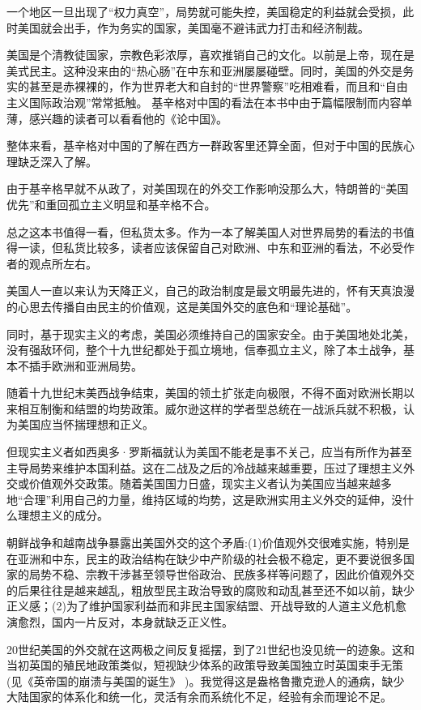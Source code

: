 一个地区一旦出现了“权力真空”，局势就可能失控，美国稳定的利益就会受损，此时美国就会出手，作为务实的国家，美国毫不避讳武力打击和经济制裁。

美国是个清教徒国家，宗教色彩浓厚，喜欢推销自己的文化。以前是上帝，现在是美式民主。这种没来由的“热心肠”在中东和亚洲屡屡碰壁。同时，美国的外交是务实的甚至是赤裸裸的，作为世界老大和自封的“世界警察”吃相难看，而且和“自由主义国际政治观”常常抵触。
基辛格对中国的看法在本书中由于篇幅限制而内容单薄，感兴趣的读者可以看看他的《论中国》。

整体来看，基辛格对中国的了解在西方一群政客里还算全面，但对于中国的民族心理缺乏深入了解。

由于基辛格早就不从政了，对美国现在的外交工作影响没那么大，特朗普的“美国优先”和重回孤立主义明显和基辛格不合。

总之这本书值得一看，但私货太多。作为一本了解美国人对世界局势的看法的书值得一读，但私货比较多，读者应该保留自己对欧洲、中东和亚洲的看法，不必受作者的观点所左右。

美国人一直以来认为天降正义，自己的政治制度是最文明最先进的，怀有天真浪漫的心思去传播自由民主的价值观，这是美国外交的底色和“理论基础”。

同时，基于现实主义的考虑，美国必须维持自己的国家安全。由于美国地处北美，没有强敌环伺，整个十九世纪都处于孤立境地，信奉孤立主义，除了本土战争，基本不插手欧洲和亚洲局势。

随着十九世纪末美西战争结束，美国的领土扩张走向极限，不得不面对欧洲长期以来相互制衡和结盟的均势政策。威尔逊这样的学者型总统在一战派兵就不积极，认为美国应当怀揣理想和正义。

但现实主义者如西奥多·罗斯福就认为美国不能老是事不关己，应当有所作为甚至主导局势来维护本国利益。这在二战及之后的冷战越来越重要，压过了理想主义外交或价值观外交政策。随着美国国力日盛，现实主义者认为美国应当越来越多地“合理”利用自己的力量，维持区域的均势，这是欧洲实用主义外交的延伸，没什么理想主义的成分。

朝鲜战争和越南战争暴露出美国外交的这个矛盾:(1)价值观外交很难实施，特别是在亚洲和中东，民主的政治结构在缺少中产阶级的社会极不稳定，更不要说很多国家的局势不稳、宗教干涉甚至领导世俗政治、民族多样等问题了，因此价值观外交的后果往往是越来越乱，粗放型民主政治导致的腐败和动乱甚至还不如以前，缺少正义感；(2)为了维护国家利益而和非民主国家结盟、开战导致的人道主义危机愈演愈烈，国内一片反对，本身就缺乏正义性。

20世纪美国的外交就在这两极之间反复摇摆，到了21世纪也没见统一的迹象。这和当初英国的殖民地政策类似，短视缺少体系的政策导致美国独立时英国束手无策(见《英帝国的崩溃与美国的诞生》 )。我觉得这是盎格鲁撒克逊人的通病，缺少大陆国家的体系化和统一化，灵活有余而系统化不足，经验有余而理论不足。

